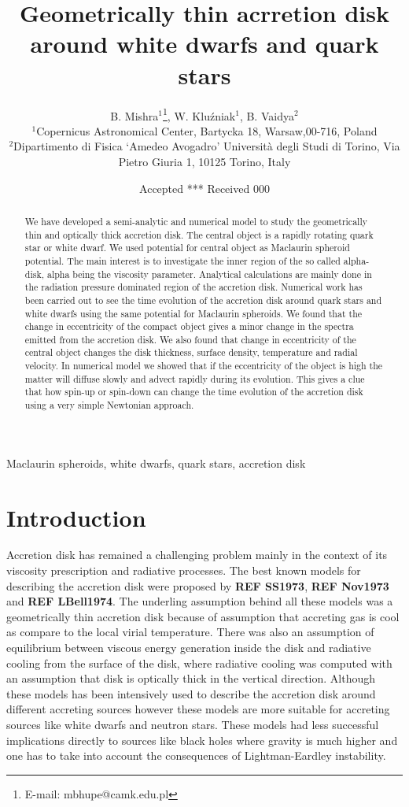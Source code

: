 \documentclass[useAMS,usenatbib]{mn2e}
\title[Geometrically thin acrretion disk around white dwarfs and quark stars]{Geometrically thin acrretion disk around white dwarfs and quark stars}
\author[B. Mishra, W. Klu\'zniak and B. Vaidya]{B. Mishra$^{1}$\thanks{E-mail:
mbhupe@camk.edu.pl}, W. Klu\'zniak$^{1}$, B. Vaidya$^{2}$\\
$^{1}$Copernicus Astronomical Center, Bartycka 18, Warsaw,00-716, Poland\\
$^{2}$Dipartimento di Fisica `Amedeo Avogadro' Università degli Studi di Torino, Via Pietro Giuria 1, 10125 Torino, Italy}
\newcommand{\mref}[1]{\textbf{REF #1}}
\begin{document}
\date{Accepted *** Received 000}
\pagerange{\pageref{firstpage}--\pageref{lastpage}} 
\maketitle
\label{firstpage}
\begin{abstract}
We have developed a semi-analytic and numerical model to study the geometrically thin and optically thick accretion disk. The central object is a rapidly rotating quark star or white dwarf. We used potential for central object as Maclaurin spheroid potential. The main interest is to investigate the inner region of the so called alpha-disk, alpha being the viscosity parameter. Analytical calculations are mainly done in the radiation pressure dominated region of the accretion disk. Numerical work has been carried out to see the time evolution of the accretion disk around quark stars and white dwarfs using the same potential for Maclaurin spheroids. We found that the change in eccentricity of the compact object gives a minor change in the spectra emitted from the accretion disk. We also found that change in eccentricity of the central object changes the disk thickness, surface density, temperature and radial velocity. In numerical model we showed that if the eccentricity of the object is high the matter will diffuse slowly and advect rapidly during its evolution. This gives a clue that how spin-up or spin-down can change the time evolution of the accretion disk using a very simple Newtonian approach.  
\end{abstract}
\begin{keywords}
Maclaurin spheroids, white dwarfs, quark stars, accretion disk
\end{keywords}
\section{Introduction}
Accretion disk has remained a challenging problem mainly in the context of its viscosity prescription and radiative processes. The best known models for describing the accretion disk were proposed by \mref{SS1973}, \mref{Nov1973} and \mref{LBell1974}. The underling assumption behind all these models was a geometrically thin accretion disk because of assumption that accreting gas is cool as compare to the local virial temperature. There was also an assumption of equilibrium between viscous energy generation inside the disk and radiative cooling from the surface of the disk, where radiative cooling was computed with an assumption that disk is optically thick in the vertical direction. Although these models has been intensively used to describe the accretion disk around different accreting sources however these models are more suitable for accreting sources like white dwarfs and neutron stars. These models had less successful implications directly to sources like black holes where gravity is much higher and one has to take into account the consequences of Lightman-Eardley instability. 
\end{document}
